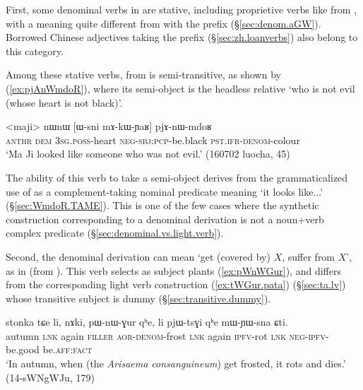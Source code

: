 First, some denominal verbs in  are stative, including proprietive verbs like   from , with a meaning quite different from  with the  prefix (§\ref{sec:denom.aGW}).  Borrowed Chinese adjectives taking the  prefix (§\ref{sec:zh.loanverbs}) also belong to this category.
 
Among these stative verbs,   from   is semi-transitive, as shown by (\ref{ex:pjAnWmdoR}), where its semi-object is the headless relative  `who is not evil (whose heart is not black)'.  
  
\begin{exe}
\ex \label{ex:pjAnWmdoR}
 \gll <maji> nɯnɯ [ɯ-sni mɤ-kɯ-ɲaʁ] pjɤ-nɯ-mdoʁ  \\
  \textsc{anthr} \textsc{dem} \textsc{3sg}.\textsc{poss}-heart \textsc{neg}-\textsc{sbj}:\textsc{pcp}-be.black \textsc{pst}.\textsc{ifr}-\textsc{denom}-colour \\
 \glt `Ma Ji looked like someone who was not evil.' (160702 luocha, 45)
\end{exe}

The ability of this verb to take a semi-object derives from the grammaticalized use of  as a complement-taking nominal predicate meaning `it looks like...' (§\ref{sec:WmdoR.TAME}). This is one of the few cases where the synthetic construction corresponding to a denominal derivation is not a noun+verb complex predicate (§\ref{sec:denominal.vs.light.verb}).

 
 
Second, the  denominal derivation can mean `get (covered by) $X$, suffer from $X$', as in  (from ). This verb selects as subject plants (\ref{ex:pWnWGur}), and differs from the corresponding light verb construction  (\ref{ex:tWGur.pata}) (§\ref{sec:ta.lv}) whose transitive subject is dummy (§\ref{sec:transitive.dummy}).
 
 
 \begin{exe}
\ex \label{ex:pWnWGur}
 \gll stonka tɕe li, nɤki, pɯ-nɯ-ɣur qʰe, li pjɯ-tsɣi qʰe mɯ-ɲɯ-sna ɕti. \\
autumn \textsc{lnk} again \textsc{filler} \textsc{aor}-\textsc{denom}-frost \textsc{lnk} again \textsc{ipfv}-rot \textsc{lnk} \textsc{neg}-\textsc{ipfv}-be.good be.\textsc{aff}:\textsc{fact} \\
\glt `In autumn, when (the \textit{Arisaema consanguineum}) get frosted, it rots and dies.' (14-sWNgWJu, 179)
\end{exe}

